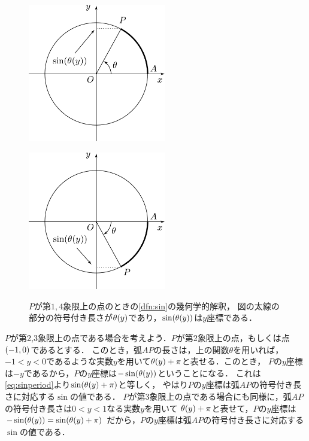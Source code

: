 \documentclass[11pt,a4paper]{ltjsarticle}
\newcommand*{\coord}[1]{\paren{#1}}
\theoremstyle{definition}
\begin{document}
\begin{figure}[htbp]
  \begin{minipage}{.45\linewidth}
    \centering
    \includegraphics[width=60mm]{fig/circle.pdf}
    \label{fig:circleposi}
  \end{minipage}
  \begin{minipage}{.45\linewidth}
    \centering
    \includegraphics[width=60mm]{fig/circlenega.pdf}
    \label{fig:circlenega}
  \end{minipage}
  \caption{$P$が第$1,4$象限上の点のときの\cref{dfn:sin}の幾何学的解釈，
    図の太線の部分の符号付き長さが$\apply{\theta}{y}$であり，$\apply{\sin}{\apply{\theta}{y}}$は$y$座標である．}
  \label{fig:circle}
\end{figure}

$P$が第2,3象限上の点である場合を考えよう．$P$が第2象限上の点，もしくは点$\coord{-1,0}$であるとする．
このとき，弧$AP$の長さは，上の関数$\theta$を用いれば，
$-1 < y < 0$であるような実数$y$を用いて$\apply{\theta}{y} + \pi$と表せる．このとき，
$P$の$y$座標は$-y$であるから，$P$の$y$座標は$- \apply{\sin}{\apply{\theta}{y}}$ということになる．
これは\cref{eq:sinperiod}より$\apply{\sin}{\apply{\theta}{y} + \pi}$と等しく，
やはり$P$の$y$座標は弧$AP$の符号付き長さに対応する$\sin$の値である．
$P$が第3象限上の点である場合にも同様に，弧$AP$の符号付き長さは$0 < y < 1$なる実数$y$を用いて
$\apply{\theta}{y} + \pi$と表せて，$P$の$y$座標は$- \apply{\sin}{\apply{\theta}{y}} = \apply{\sin}{\apply{\theta}{y} + \pi}$
だから，$P$の$y$座標は弧$AP$の符号付き長さに対応する$\sin$の値である．
\end{document}
